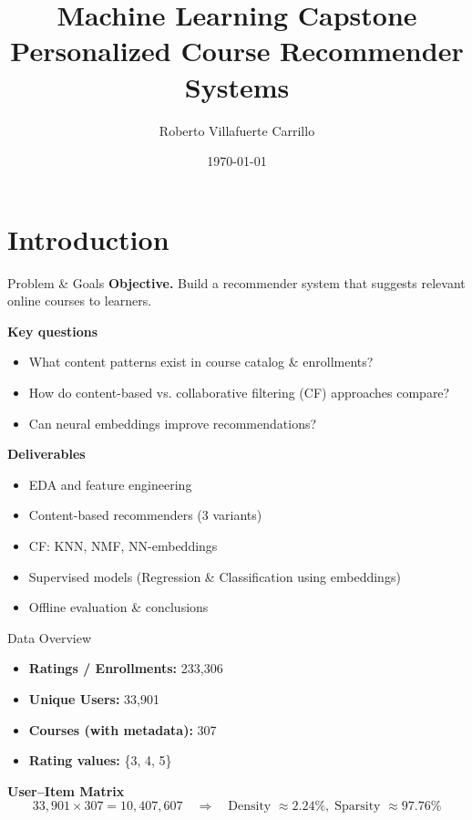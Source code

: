 \documentclass[aspectratio=169]{beamer}
\title[ML Capstone: Recommender Systems]{Machine Learning Capstone\\Personalized Course Recommender Systems}
\author{Roberto Villafuerte Carrillo}
\institute{IBM ML321EN Capstone}
\date{\today}
\newcommand{\users}{33{,}901}
\newcommand{\items}{307}
\newcommand{\interactions}{233{,}306}
\newcommand{\density}{2.24\%}
\newcommand{\sparsity}{97.76\%}
\begin{document}
\begin{frame}
  \titlepage
\end{frame}


\section{Introduction}

\begin{frame}{Problem \& Goals}
\textbf{Objective.} Build a recommender system that suggests relevant online courses to learners.

\textbf{Key questions}
\begin{itemize}
  \item What content patterns exist in course catalog \& enrollments?
  \item How do content-based vs. collaborative filtering (CF) approaches compare?
  \item Can neural embeddings improve recommendations?
\end{itemize}

\textbf{Deliverables}
\begin{itemize}
  \item EDA and feature engineering
  \item Content-based recommenders (3 variants)
  \item CF: KNN, NMF, NN-embeddings
  \item Supervised models (Regression \& Classification using embeddings)
  \item Offline evaluation \& conclusions
\end{itemize}
\end{frame}

\begin{frame}{Data Overview}
\begin{itemize}
  \item \textbf{Ratings / Enrollments:} \interactions
  \item \textbf{Unique Users:} \users
  \item \textbf{Courses (with metadata):} \items
  \item \textbf{Rating values:} \{3, 4, 5\}
\end{itemize}

\bigskip
\textbf{User–Item Matrix}
\[
\users \times \items = 10{,}407{,}607 \quad\Rightarrow\quad
\text{Density } \approx \density,\; \text{Sparsity } \approx \sparsity
\]
\end{frame}
\end{document}
